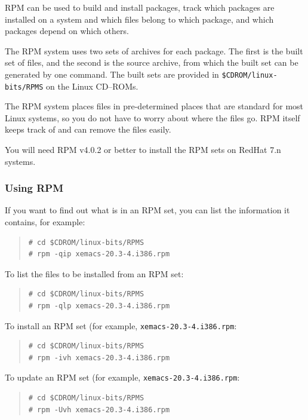 \documentclass[twoside,11pt]{article}
\renewcommand{\_}{\texttt{\symbol{95}}}
\newcommand{\cdroms}{CD--ROMs}
\newcommand{\cdroms}{CD-ROMs}
\begin{document}
RPM can be used to build and install packages, track which packages are
installed on a system and which files belong to which package, and which
packages depend on which others.

The RPM system uses two sets of archives for each package.  The first
is the built set of files, and the second is the source archive, from
which the built set can be generated by one command.  The built sets
are provided in \texttt{\$CDROM/linux-bits/RPMS} on the Linux
\cdroms.

The RPM system places files in pre-determined places that are standard for
most Linux systems, so you do not have to worry about where the files go.
RPM itself keeps track of and can remove the files easily.

You will need RPM v4.0.2 or better to install the RPM sets on RedHat 7.n
systems.

\subsubsection{Using RPM}

If you want to find out what is in an RPM set, you can list the information
it contains, for example:

\begin{quote}
\begin{verbatim}
# cd $CDROM/linux-bits/RPMS
# rpm -qip xemacs-20.3-4.i386.rpm
\end{verbatim}
\end{quote}

To list the files to be installed from an RPM set:

\begin{quote}
\begin{verbatim}
# cd $CDROM/linux-bits/RPMS
# rpm -qlp xemacs-20.3-4.i386.rpm
\end{verbatim}
\end{quote}

To install an RPM set (for example, \texttt{xemacs-20.3-4.i386.rpm}:

\begin{quote}
\begin{verbatim}
# cd $CDROM/linux-bits/RPMS
# rpm -ivh xemacs-20.3-4.i386.rpm
\end{verbatim}
\end{quote}

To update an RPM set (for example, \texttt{xemacs-20.3-4.i386.rpm}:

\begin{quote}
\begin{verbatim}
# cd $CDROM/linux-bits/RPMS
# rpm -Uvh xemacs-20.3-4.i386.rpm
\end{verbatim}
\end{quote}
\end{document}
